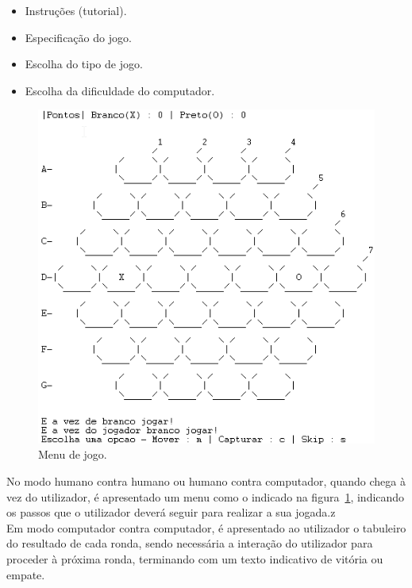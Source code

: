 \documentclass[a4paper]{article}
\begin{document}
\begin{itemize}
	\item Instruções (tutorial).
	\item Especificação do jogo.
	\item Escolha do tipo de jogo.
	\item Escolha da dificuldade do computador.
\end{itemize} 

\begin{figure}[h]

    	\centering
     	\includegraphics[scale=0.5]{ingame1}
	\caption{Menu de jogo.}
	\label{fig:figuramenu}

\end{figure}
No modo humano contra humano ou humano contra computador, quando chega à vez do utilizador, é apresentado um menu como o indicado na figura~\ref{fig:figuramenu}, indicando os passos que o utilizador deverá seguir para realizar a sua jogada.z
\\
Em modo computador contra computador, é apresentado ao utilizador o tabuleiro do resultado de cada ronda, sendo necessária a interação do utilizador para proceder à próxima ronda, terminando com um texto indicativo de vitória ou empate.



\newpage
\end{document}
